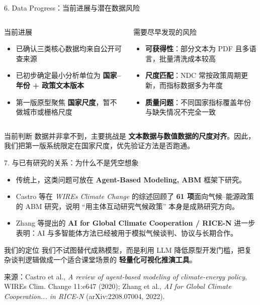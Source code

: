 \documentclass[aspectratio=169,10.5pt]{ctexbeamer}
\newcommand{\source}[1]{\vfill{\tiny\color{textgray}来源：#1}}
\begin{document}
\begin{frame}{6. Data Progress：当前进展与潜在数据风险}
  \begin{columns}[T]
    \begin{block}{当前进展}
      \begin{itemize}
        \item 已确认三类核心数据均来自公开可查来源
        \item 已初步确定最小分析单位为 \textbf{国家--年份 + 政策文本版本}
        \item 第一版原型聚焦 \textbf{国家尺度}，暂不做城市或栅格尺度
      \end{itemize}
    \end{block}
    \begin{block}{需要尽早发现的风险}
      \begin{itemize}
        \item \textbf{可获得性}：部分文本为 PDF 且多语言，批量清洗成本较高
        \item \textbf{尺度匹配}：NDC 常按政策周期更新，而指标数据多为年度
        \item \textbf{质量问题}：不同国家指标覆盖年份与缺失情况不完全一致
      \end{itemize}
    \end{block}
  \end{columns}
  \begin{alertblock}{当前判断}
    数据并非拿不到，主要挑战是 \textbf{文本数据与数值数据的尺度对齐}。因此，我们把第一版系统限定在国家尺度，优先验证方法是否跑通。
  \end{alertblock}
\end{frame}

\begin{frame}{7. 与已有研究的关系：为什么不是凭空想象}
  \begin{itemize}
    \item 传统上，这类问题可放在 \textbf{Agent-Based Modeling, ABM} 框架下研究。
    \item Castro 等在 \emph{WIREs Climate Change} 的综述回顾了 \textbf{61 项}面向气候--能源政策的 ABM 研究，说明 ``用主体互动研究气候政策'' 本身是成熟研究方向。
    \item Zhang 等提出的 \textbf{AI for Global Climate Cooperation / RICE-N} 进一步表明：AI 与多智能体方法已经被用于模拟气候谈判、协议与长期合作。
  \end{itemize}
  \begin{alertblock}{我们的定位}
    我们不试图替代成熟模型，而是利用 LLM 降低原型开发门槛，把复杂谈判逻辑做成一个适合课堂场景的 \textbf{轻量化可视化推演工具}。
  \end{alertblock}
  \source{Castro et al., \emph{A review of agent-based modeling of climate-energy policy}, WIREs Clim. Change 11:e647 (2020); Zhang et al., \emph{AI for Global Climate Cooperation... in RICE-N} (arXiv:2208.07004, 2022).}
\end{frame}
\end{document}
